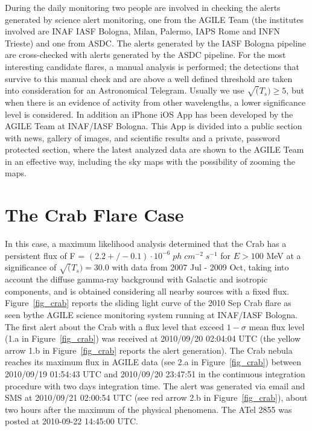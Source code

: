During the daily monitoring two people are involved in checking the alerts generated by science alert monitoring, one from the AGILE Team (the institutes involved are INAF IASF Bologna, Milan, Palermo, IAPS Rome and INFN Trieste) and one from ASDC. The alerts generated by the  IASF Bologna pipeline are cross-checked with alerts generated by the ASDC pipeline. For the most interesting candidate flares, a manual analysis is performed; the detections that survive to this manual check and are above a well defined threshold are taken into consideration for an Astronomical Telegram. Usually we use $\sqrt(T_s) \ge 5$, but when there is an evidence of activity from other wavelengths, a lower significance level is considered. In addition an iPhone iOS App has been developed by the AGILE Team at INAF/IASF Bologna. This App is divided into a public section with news, gallery of images, and scientific results and a private, password protected section, where the latest analyzed data are shown to the AGILE Team in an effective way, including the sky maps with the possibility of zooming the maps.
      
      
\section{The Crab Flare Case}

In this case, a maximum likelihood analysis determined that the Crab has a persistent flux of F = $(2.2 +/- 0.1) \cdot 10^{-6} \; ph \; cm^{-2} \; s^{-1}$ for $E > 100$ MeV at a significance of $\sqrt(T_s) = 30.0$ with data from 2007 Jul - 2009 Oct, taking into account the diffuse gamma-ray background with Galactic and isotropic components, and is obtained considering all nearby sources with a fixed flux. Figure~\ref{fig_crab} reports the sliding light curve of the  2010 Sep Crab flare as seen bythe  AGILE science monitoring system running at INAF/IASF Bologna. The first alert about the Crab with a flux level that exceed $1-\sigma$ mean flux level (1.a in Figure~\ref{fig_crab}) was received at 2010/09/20 02:04:04 UTC (the yellow arrow 1.b in Figure~\ref{fig_crab} reports the alert generation). The Crab nebula reaches its maximum flux in AGILE data (see 2.a in Figure~\ref{fig_crab}) between 2010/09/19 01:54:43 UTC and 2010/09/20 23:47:51 in the continuous integration procedure with two days integration time. The alert was generated via email and SMS at 2010/09/21 02:00:54 UTC (see red arrow 2.b in Figure~\ref{fig_crab}), about two hours after the maximum of the physical phenomena. The ATel 2855 \citep{Tavani:ATEL} was posted at 2010-09-22 14:45:00 UTC.
      
